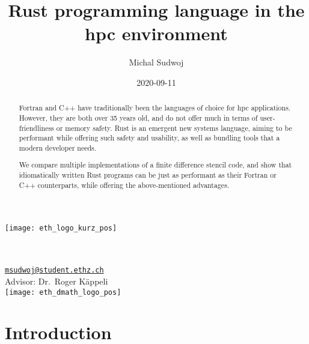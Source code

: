 \documentclass[british]{scrreprt}
\title{Rust programming language in the \acrlong{hpc} environment}
\author{Michal Sudwoj}
\date{2020-09-11}
\begin{document}
\newlength\ETHE
\setlength{}
\edef\ETHE{\the\ETHE}
\newlength\ETHD
\setlength{}
\edef\ETHD{\the\ETHD}

\begin{titlepage}
	\makeatletter
	\texttt{[image: eth\_logo\_kurz\_pos]}

	\vfill
	\centering
	\textbf{\Huge \@title} \\[2\baselineskip]

	{\Large \@author} \\
	\texttt{\href{mailto:msudwoj@student.ethz.ch}{msudwoj@student.ethz.ch}} \\[2\baselineskip]

	{\Large \DTMDate{\@date}}
	\vfill
	\raggedleft
	Advisor: Dr.\ Roger Käppeli \\[2\baselineskip]
	\texttt{[image: eth\_dmath\_logo\_pos]}
\end{titlepage}


\begin{abstract}
	Fortran and C++ have traditionally been the languages of choice for \gls{hpc} applications. However, they are both over 35 years old, and do not offer much in terms of user-friendliness or memory safety. Rust is an emergent new systems language, aiming to be performant while offering such safety and usability, as well as bundling tools that a modern developer needs.

	We compare multiple implementations of a finite difference stencil code, and show that idiomatically written Rust programs can be just as performant as their Fortran or C++ counterparts, while offering the above-mentioned advantages.
\end{abstract}

\tableofcontents

\chapter{Introduction}
\label{ch:introduction}
\end{document}
